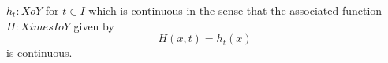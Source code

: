 \documentclass[preview]{standalone}
\begin{document}
\begin{center}
$h_t : X 	o Y$ for $t \in I$ which is continuous in the sense that the associated function $H : X 	imes I 	o Y$ given by $$H(x,t) = h_t(x)$$ is continuous.
\end{center}
\end{document}
